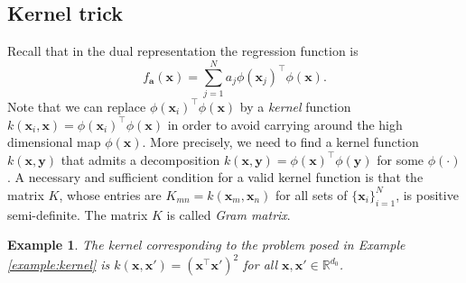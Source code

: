 \documentclass[11pt]{article}
\newcommand{\x}{\textbf{x}}
\newcommand{\R}{\mathbb{R}}
\newcommand{\bo}[1]{{\mathbf #1}}
\newtheorem{example}{Example}[section]
\begin{document}
\subsection{Kernel trick}
Recall that in the dual representation the regression function is
\begin{equation}
  f_{\bo{a}}(\x) = \sum_{j=1}^{N} a_j \phi(\x_j)^\top \phi(\x).
\end{equation}
Note that we can replace $\phi(\x_i)^\top \phi(\x)$ by a {\it kernel}
function $k(\x_i, \x) = \phi(\x_i)^\top \phi(\x)$ in order to avoid
carrying around the high dimensional map $\phi(\x)$. More precisely,
we need to find a kernel function $k(\x, \bo{y})$ that admits a
decomposition $k(\x, \bo{y}) = \phi(\x)^\top \phi(\bo{y})$ for some
$\phi(\cdot)$. A necessary and sufficient condition for a valid kernel
function is that the matrix $K$, whose entries are $K_{mn} = k(\x_m,
\x_n)$ for all sets of $\{\x_i\}_{i=1}^{N}$, is positive
semi-definite. The matrix $K$ is called {\it Gram matrix}.
\begin{example}
  The kernel corresponding to the problem posed in Example
  \ref{example:kernel} is $k(\x, \x') = (\x^\top \x')^2$ for all $\x,
  \x' \in \R^{d_0}$.
\end{example}
\end{document}
